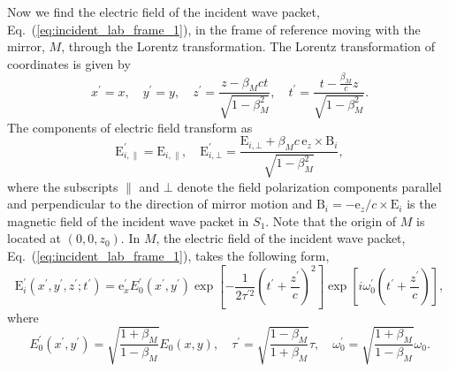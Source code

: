 \documentclass[10pt, a4paper, twoside, openright]{report}
\renewcommand{\vec}[1]{\boldsymbol{\mathrm{#1}}}
\begin{document}
Now we find the electric field of the incident wave packet, Eq.~(\ref{eq:incident_lab_frame_1}), in the frame of reference moving with the mirror, $ M $, through the Lorentz transformation. The Lorentz transformation of coordinates is given by
\begin{equation}\label{eq:lorentz_transform_coords}
x^{\prime} = x, \quad y^{\prime} = y, \quad z^{\prime} = \frac{z - \beta_M c t}{\sqrt{1 - \beta_M^2}}, \quad t^{\prime} = \frac{t - \frac{\beta_M}{c} z}{\sqrt{1 - \beta_M^2}}.
\end{equation}
The components of electric field transform as
\begin{equation}\label{eq:lorentz_transform_fields}
\vec{E}^{\prime}_{i, \parallel} = \vec{E}_{i, \parallel}, \quad \vec{E}^{\prime}_{i, \bot} = \frac{\vec{E}_{i, \bot} + \beta_M c \, \vec{e}_z \times \vec{B}_{i}}{\sqrt{1 - \beta_M^2}},
\end{equation}
where the subscripts $ \parallel $ and $ \bot $ denote the field polarization components parallel and perpendicular to the direction of mirror motion and $ \vec{B}_{i} = -\vec{e}_z / c \times \vec{E}_i $ is the magnetic field of the incident wave packet in $ S_1 $. Note that the origin of $ M $ is located at $ \left( 0, 0, z_0 \right) $. In $ M $, the electric field of the incident wave packet, Eq.~(\ref{eq:incident_lab_frame_1}), takes the following form,
\begin{equation}\label{eq:incident_boost_frame}
\vec{E}^{\prime}_i \left(x^{\prime}, y^{\prime}, z^{\prime}; t^{\prime} \right) = \vec{e}_x^{\prime} E^{\prime}_0 \left(x^{\prime}, y^{\prime} \right) \exp \left[ - \frac{1}{2 \tau^{\prime 2}} \left(t^{\prime} + \frac{z^{\prime}}{c}\right)^2 \right] \exp \left[ i \omega_0^{\prime} \left(t^{\prime} + \frac{z^{\prime}}{c}\right) \right],
\end{equation}
where
\begin{equation}\label{eq:coeff_boost}
E^{\prime}_0 \left(x^{\prime}, y^{\prime} \right) = \sqrt{\frac{1 + \beta_M}{1 - \beta_M}} E_0 \left(x, y \right), \quad \tau^{\prime} = \sqrt{\frac{1 - \beta_M}{1 + \beta_M}} \tau, \quad \omega_0^{\prime} = \sqrt{\frac{1 + \beta_M}{1 - \beta_M}} \omega_0.
\end{equation}
\end{document}

